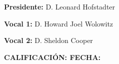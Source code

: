 \vspace{2.0cm}
\textbf{\Large Presidente:}{\Large{} D. Leonard Hofstadter}{\Large \par} %

\vspace{2.0cm}
\textbf{\Large Vocal 1:}{\Large{} D. Howard Joel Wolowitz}{\Large \par} %

\vspace{2.0cm}
\textbf{\Large Vocal 2:}{\Large{} D. Sheldon Cooper}{\Large \par} %

\vspace{0.8cm}
\textbf{ CALIFICACIÓN: \hspace{6cm}FECHA:}{ \par}



